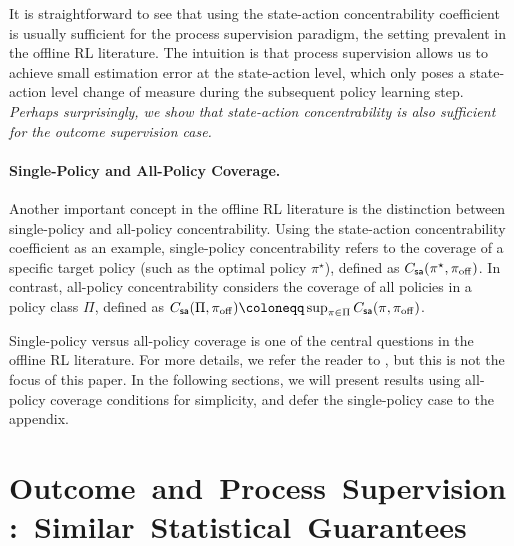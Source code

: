\documentclass{article}
\let\oldparagraph\paragraph
\renewcommand{\paragraph}[1]{\oldparagraph{#1.}}
\begin{document}
It is straightforward to see that using the state-action concentrability coefficient is usually sufficient for the process supervision paradigm, the setting prevalent in the offline RL literature. The intuition is that process supervision allows us to achieve small estimation error at the state-action level, which only poses a state-action level change of measure during the subsequent policy learning step. \emph{Perhaps surprisingly, we show that state-action concentrability is also sufficient for the outcome supervision case.}

\paragraph{Single-Policy and All-Policy Coverage}

Another important concept in the offline RL literature is the distinction between single-policy and all-policy concentrability. Using the state-action concentrability coefficient as an example, single-policy concentrability refers to the coverage of a specific target policy (such as the optimal policy $\pi^\star$), defined as $C_{\mathsf{sa}}(\pi^\star, \pi_{\mathrm{off}})$. In contrast, all-policy concentrability considers the coverage of all policies in a policy class $\Pi$, defined as $\Cs(\Pi, \pioff)\coloneqq\sup_{\pi\in\Pi}\Cs(\pi, \pioff)$.

Single-policy versus all-policy coverage is one of the central questions in the offline RL literature. For more details, we refer the reader to \citet{chen2019information,xie2021bellman,jiang2024offline}, but this is not the focus of this paper. In the following sections, we will present results using all-policy coverage conditions for simplicity, and defer the single-policy case to the appendix.
















\section[Outcome and Process Supervision: Similar Statistical Guarantees]{\font{}\font{}\font\mbox{Outcome and Process Supervision: Similar Statistical Guarantees}}\label{sec: orm-reward}
\end{document}

